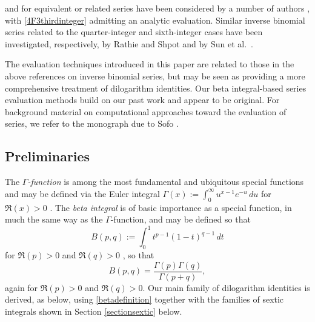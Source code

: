 \documentclass[12pt]{article}
\begin{document}
 and for equivalent or related series have been considered by a number of authors 
 \cite{AdegokeFrontczakGoy2024,Batir2005,CampbellLevrie2024,Chu2022,ChudnovskyChudnovsky1998,DAurizioDiTrani2018}, with 
 \eqref{4F3thirdinteger} admitting an analytic evaluation. Similar inverse binomial series related to the quarter-integer and sixth-integer 
 cases have been investigated, respectively, by Rathie and Shpot \cite{RathieShpot2025} and by Sun 
 et al.\ \cite{Sun2024,SunZhoupreprint}. 
 
 The evaluation techniques introduced in this paper are related to those in the above references on inverse binomial series, but may be 
 seen as providing a more comprehensive treatment of dilogarithm identities. Our beta integral-based series evaluation methods build 
 on our past work \cite{Hakimoglupreprint} and appear to be original. For background 
 material on computational approaches 
 toward the evaluation of series, we refer to the monograph due to Sofo \cite{SOFO2003}. 

\subsection{Preliminaries}
 The \emph{$\Gamma$-function} is among the most fundamental and ubiquitous special functions and may be defined via the Euler 
 integral $\Gamma(x) := \int_{0}^{\infty} u^{x-1} e^{-u} \, du$ for $\Re(x) > 0$ \cite[\S2]{Rainville1960}. The \emph{beta integral} is of 
 basic importance as a special function, in much the same way as the $\Gamma$-function, and may be defined so that 
\begin{equation}\label{betadefinition}
 B(p, q) := \int_{0}^{1} t^{p-1} (1-t)^{q-1} \, dt 
\end{equation}
 for $\Re(p) > 0$ and $\Re(q) > 0$ \cite[\S2.16]{Rainville1960}, so that 
\begin{equation}\label{betaevaluate}
 B(p, q) = \frac{ \Gamma(p) \Gamma(q) }{ \Gamma(p + q)}, 
\end{equation}
 again for $\Re(p) > 0$ and $\Re(q) > 0$. Our main family of dilogarithm identities is derived, as below, using \eqref{betadefinition} 
 together with the families of sextic integrals shown in Section \ref{sectionsextic} below. 
\end{document}
